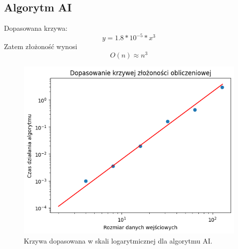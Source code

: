 \documentclass[11pt, leqno]{scrartcl}
\begin{document}
    \subsection{Algorytm AI}
    Dopasowana krzywa:
    \[
        y=1.8*10^{-5}*x^3
    \]
    Zatem złożoność wynosi
    \[
        O(n) \approx n^3
    \]
    \begin{figure}[H]
        \centering
        \includegraphics[width=0.8\linewidth]{zlozonosc_strassen.png}
        \caption{Krzywa dopasowana w skali logarytmicznej dla
            algorytmu AI.}
    \end{figure}
\end{document}
